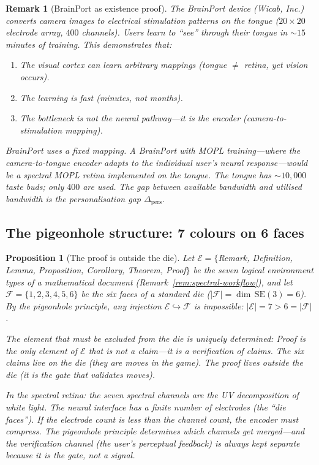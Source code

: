 \documentclass[11pt,a4paper]{article}
\newtheorem{proposition}[theorem]{Proposition}
\newtheorem{remark}[theorem]{Remark}
\newcommand{\cF}{\mathcal{F}}
\newcommand{\cE}{\mathcal{E}}
\begin{document}
\begin{remark}[BrainPort as existence proof]%
\label{rem:brainport}
The BrainPort device (Wicab, Inc.) converts camera images
to electrical stimulation patterns on the tongue
($20 \times 20$ electrode array, $400$ channels).
Users learn to ``see'' through their tongue in
$\sim\!15$ minutes of training.
This demonstrates that:
\begin{enumerate}[nosep]
\item The visual cortex can learn arbitrary mappings
  (tongue $\neq$ retina, yet vision occurs).
\item The learning is fast (minutes, not months).
\item The bottleneck is not the neural pathway---it is the
  \emph{encoder} (camera-to-stimulation mapping).
\end{enumerate}
BrainPort uses a fixed mapping.
A BrainPort with MOPL training---where the
camera-to-tongue encoder adapts to the individual
user's neural response---would be a spectral MOPL
retina implemented on the tongue.
The tongue has $\sim\!10{,}000$ taste buds; only
$400$ are used.
The gap between available bandwidth and utilised
bandwidth is the personalisation gap
$\Delta_{\text{pers}}$.
\end{remark}

\subsection{The pigeonhole structure: 7 colours on 6 faces}
\label{app:pigeonhole}

\begin{proposition}[The proof is outside the die]%
\label{prop:pigeonhole-proof}
Let $\cE = \{$Remark, Definition, Lemma, Proposition,
Corollary, Theorem, Proof$\}$ be the seven logical
environment types of a mathematical document
(Remark~\ref{rem:spectral-workflow}),
and let $\cF = \{1, 2, 3, 4, 5, 6\}$ be the six faces
of a standard die
($|\cF| = \dim\,\mathrm{SE}(3) = 6$).
By the pigeonhole principle, any injection
$\cE \hookrightarrow \cF$ is impossible:
$|\cE| = 7 > 6 = |\cF|$.

The element that must be excluded from the die is
uniquely determined:
\emph{Proof} is the only element of $\cE$ that is not
a \emph{claim}---it is a \emph{verification} of claims.
The six claims live on the die (they are moves in the game).
The proof lives outside the die (it is the gate that
validates moves).

In the spectral retina:
the seven spectral channels are the UV decomposition
of white light.
The neural interface has a finite number of electrodes
(the ``die faces'').
If the electrode count is less than the channel count,
the encoder must compress.
The pigeonhole principle determines \emph{which}
channels get merged---and the verification channel
(the user's perceptual feedback) is always kept separate
because it is the gate, not a signal.
\end{proposition}
\end{document}
